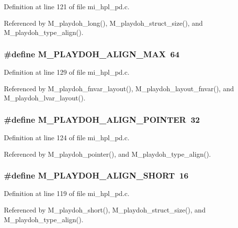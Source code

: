 Definition at line 121 of file mi\_\-hpl\_\-pd.c.

Referenced by M\_\-playdoh\_\-long(), M\_\-playdoh\_\-struct\_\-size(), and M\_\-playdoh\_\-type\_\-align().
\subsubsection{\setlength{\rightskip}{0pt plus 5cm}\#define M\_\-PLAYDOH\_\-ALIGN\_\-MAX~64}\label{mi__hpl__pd_8c_8d32b315279594b4571125c3bb22fac1}




Definition at line 129 of file mi\_\-hpl\_\-pd.c.

Referenced by M\_\-playdoh\_\-fnvar\_\-layout(), M\_\-playdoh\_\-layout\_\-fnvar(), and M\_\-playdoh\_\-lvar\_\-layout().
\subsubsection{\setlength{\rightskip}{0pt plus 5cm}\#define M\_\-PLAYDOH\_\-ALIGN\_\-POINTER~32}\label{mi__hpl__pd_8c_f57306ea41cf3fdb191de879b9583484}




Definition at line 124 of file mi\_\-hpl\_\-pd.c.

Referenced by M\_\-playdoh\_\-pointer(), and M\_\-playdoh\_\-type\_\-align().
\subsubsection{\setlength{\rightskip}{0pt plus 5cm}\#define M\_\-PLAYDOH\_\-ALIGN\_\-SHORT~16}\label{mi__hpl__pd_8c_b4418792aa96431e7a114feeac5dbcc3}




Definition at line 119 of file mi\_\-hpl\_\-pd.c.

Referenced by M\_\-playdoh\_\-short(), M\_\-playdoh\_\-struct\_\-size(), and M\_\-playdoh\_\-type\_\-align().
